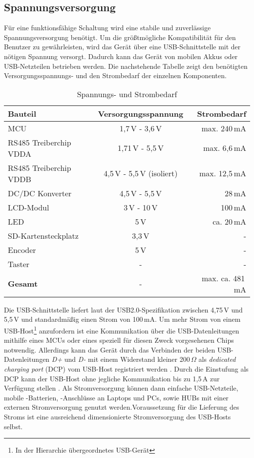 
\subsection{Spannungsversorgung}
Für eine funktionsfähige Schaltung wird eine stabile und zuverlässige Spannungsversorgung benötigt. Um die größtmögliche Kompatibilität für den Benutzer zu gewährleisten, wird das Gerät über eine USB-Schnittstelle mit der nötigen Spannung versorgt. Dadurch kann das Gerät von mobilen Akkus oder USB-Netzteilen betrieben werden. Die nachstehende Tabelle zeigt den benötigten Versorgungsspannungs- und den Strombedarf der einzelnen Komponenten. 
\begin{table}[h]
	\begin{center}
		\caption{Spannungs- und Strombedarf}
		\begin{tabular}{l | c | r }
			\textbf{Bauteil} & \textbf{Versorgungsspannung} & \textbf{Strombedarf}\\
			\hline
			MCU & 1,7\,V - 3,6\,V & max. 240\,mA\\
			RS485 Treiberchip VDDA & 1,71\,V - 5,5\,V & max. 6,6\,mA\\
			RS485 Treiberchip VDDB & 4,5\,V - 5,5\,V (isoliert)& max. 12,5\,mA\\
			DC/DC Konverter & 4,5\,V - 5,5\,V & 28\,mA\\
			LCD-Modul & 3\,V - 10\,V & 100\,mA\\
			LED & 5\,V & ca. 20\,mA\\
			SD-Kartensteckplatz & 3,3\,V & -\\
			Encoder & 5\,V & -\\
			Taster & - & -\\
			\hline
			\textbf{Gesamt} & - & max. ca. 481\,mA
		\end{tabular}
	\label{tab:VDD+IDD}
	\end{center}
\end{table}
Die USB-Schnittstelle liefert laut der USB2.0-Spezifikation zwischen 4,75\,V und 5,5\,V \cite[S. 283]{USB-PD} und standardmäßig einen Strom von 100\,mA. Um mehr Strom von einem USB-Host\footnote{In der Hierarchie übergeordnetes USB-Gerät} anzufordern ist eine Kommunikation über die USB-Datenleitungen mithilfe eines MCUs oder eines speziell für diesen Zweck vorgesehenen Chips notwendig. Allerdings kann das Gerät durch das Verbinden der beiden USB-Datenleitungen \textit{D+} und \textit{D-} mit einem Widerstand kleiner 200\,$\Omega$ als \textit{dedicated charging port} (DCP) vom USB-Host registriert werden \cite[S. 41]{USB-Battery}. Durch die Einstufung als DCP kann der USB-Host ohne jegliche Kommunikation bis zu 1,5\,A zur Verfügung stellen \cite[S. 45]{USB-Battery}. Als Stromversorgung können dann einfache USB-Netzteile, mobile -Batterien, -Anschlüsse an Laptops und PCs, sowie HUBs mit einer externen Stromversorgung genutzt werden.Voraussetzung für die Lieferung des Stroms ist eine ausreichend dimensionierte Stromversorgung des USB-Hosts selbst. 
